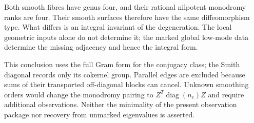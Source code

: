 Both smooth fibres have genus four,
and their rational nilpotent
monodromy ranks are four.
Their smooth surfaces therefore
have the same diffeomorphism type.
What differs is an integral
invariant of the degeneration.
The local geometric inputs alone
do not determine it; the marked
global low-mode data determine
the missing adjacency and hence
the integral form.

This conclusion uses the full
Gram form for the conjugacy class;
the Smith diagonal records only
its cokernel group. Parallel
edges are excluded because sums
of their transported off-diagonal
blocks can cancel. Unknown
smoothing orders would change
the monodromy pairing to
$Z^T\operatorname{diag}(n_e)Z$
and require additional observations.
Neither the minimality of the
present observation package nor
recovery from unmarked eigenvalues
is asserted.
